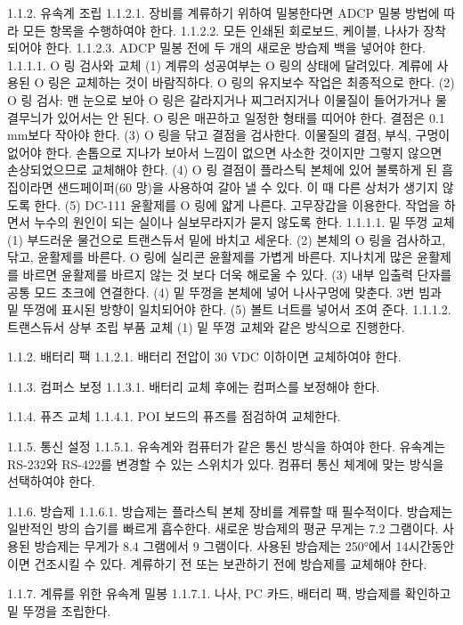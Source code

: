 \documentclass[
]{book}
\begin{document}
1.1.2. 유속계 조립
1.1.2.1. 장비를 계류하기 위하여 밀봉한다면 ADCP 밀봉 방법에 따라 모든 항목을 수행하여야 한다.
1.1.2.2. 모든 인쇄된 회로보드, 케이블, 나사가 장착되어야 한다.
1.1.2.3. ADCP 밀봉 전에 두 개의 새로운 방습제 백을 넣어야 한다.
1.1.1.1. O 링 검사와 교체
(1) 계류의 성공여부는 O 링의 상태에 달려있다. 계류에 사용된 O 링은 교체하는 것이 바람직하다. O 링의 유지보수 작업은 최종적으로 한다.
(2) O 링 검사: 맨 눈으로 보아 O 링은 갈라지거나 찌그러지거나 이물질이 들어가거나 물결무늬가 있어서는 안 된다. O 링은 매끈하고 일정한 형태를 띠어야 한다. 결점은 0.1 mm보다 작아야 한다.
(3) O 링을 닦고 결점을 검사한다. 이물질의 결점, 부식, 구멍이 없어야 한다. 손톱으로 지나가 보아서 느낌이 없으면 사소한 것이지만 그렇지 않으면 손상되었으므로 교체해야 한다.
(4) O 링 결점이 플라스틱 본체에 있어 불룩하게 된 흠집이라면 샌드페이퍼(60 망)을 사용하여 갈아 낼 수 있다. 이 때 다른 상처가 생기지 않도록 한다.
(5) DC-111 윤활제를 O 링에 얇게 나른다. 고무장갑을 이용한다. 작업을 하면서 누수의 원인이 되는 실이나 실보무라지가 묻지 않도록 한다.
1.1.1.1. 밑 뚜껑 교체
(1) 부드러운 물건으로 트랜스듀서 밑에 바치고 세운다.
(2) 본체의 O 링을 검사하고, 닦고, 윤활제를 바른다. O 링에 실리콘 윤활제를 가볍게 바른다. 지나치게 많은 윤활제를 바르면 윤활제를 바르지 않는 것 보다 더욱 해로울 수 있다.
(3) 내부 입출력 단자를 공통 모드 초크에 연결한다.
(4) 밑 뚜껑을 본체에 넣어 나사구멍에 맞춘다. 3번 빔과 밑 뚜껑에 표시된 방향이 일치되어야 한다.
(5) 볼트 너트를 넣어서 조여 준다.
1.1.1.2. 트랜스듀서 상부 조립 부품 교체
(1) 밑 뚜껑 교체와 같은 방식으로 진행한다.

1.1.2. 배터리 팩
1.1.2.1. 배터리 전압이 30 VDC 이하이면 교체하여야 한다.

1.1.3. 컴퍼스 보정
1.1.3.1. 배터리 교체 후에는 컴퍼스를 보정해야 한다.

1.1.4. 퓨즈 교체
1.1.4.1. POI 보드의 퓨즈를 점검하여 교체한다.

1.1.5. 통신 설정
1.1.5.1. 유속계와 컴퓨터가 같은 통신 방식을 하여야 한다. 유속계는 RS-232와 RS-422를 변경할 수 있는 스위치가 있다. 컴퓨터 통신 체계에 맞는 방식을 선택하여야 한다.

1.1.6. 방습제
1.1.6.1. 방습제는 플라스틱 본체 장비를 계류할 때 필수적이다. 방습제는 일반적인 방의 습기를 빠르게 흡수한다. 새로운 방습제의 평균 무게는 7.2 그램이다. 사용된 방습제는 무게가 8.4 그램에서 9 그램이다. 사용된 방습제는 250°에서 14시간동안이면 건조시킬 수 있다. 계류하기 전 또는 보관하기 전에 방습제를 교체해야 한다.

1.1.7. 계류를 위한 유속계 밀봉
1.1.7.1. 나사, PC 카드, 배터리 팩, 방습제를 확인하고 밑 뚜껑을 조립한다.
\end{document}
